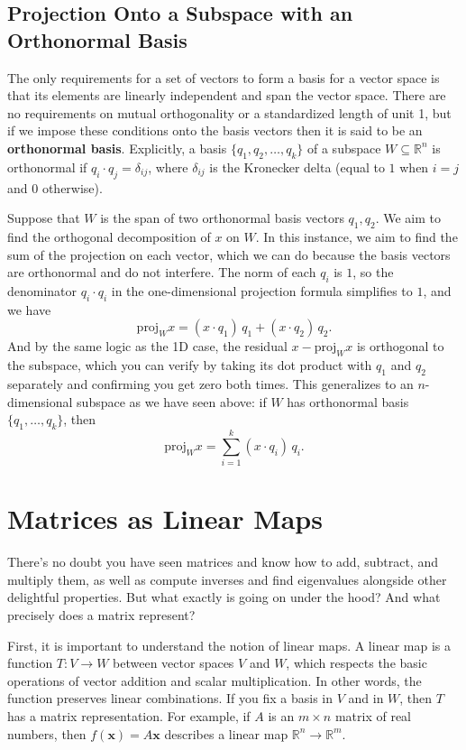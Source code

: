 \documentclass{article}
\begin{document}
\subsection{Projection Onto a Subspace with an Orthonormal Basis}

The only requirements for a set of vectors to form a basis for a vector space is that its elements
are linearly independent and span the vector space. There are no requirements on mutual orthogonality or a standardized length of unit 1, but if we impose these conditions onto the basis vectors then it is said to be an \textbf{orthonormal basis}. Explicitly, a basis $\{q_1, q_2, \dots, q_k\}$ of a subspace $W \subseteq \mathbb{R}^n$ is orthonormal if $q_i \cdot q_j = \delta_{ij}$, where $\delta_{ij}$ is the Kronecker delta (equal to $1$ when $i = j$ and $0$ otherwise).

Suppose that $W$ is the span of two orthonormal basis vectors $q_1, q_2$. We aim to find the orthogonal decomposition of $x$ on $W$. In this instance, we aim to find the sum of the projection on each vector, which we can do because the basis vectors are orthonormal and do not interfere. The norm of each $q_i$ is $1$, so the denominator $q_i \cdot q_i$ in the one-dimensional projection formula simplifies to $1$, and we have 
$$\text{proj}_W x = (x \cdot q_1)\, q_1 + (x \cdot q_2)\, q_2.$$
And by the same logic as the 1D case, the residual $x - \text{proj}_W x$ is orthogonal to the subspace, which you can verify by taking its dot product with $q_1$ and $q_2$ separately and confirming you get zero both times.
This generalizes to an $n$-dimensional subspace as we have seen above: if $W$ has orthonormal basis $\{q_1, \dots, q_k\}$, then
$$\text{proj}_W x = \sum_{i=1}^k (x \cdot q_i)\, q_i.$$

\section{Matrices as Linear Maps}

There's no doubt you have seen matrices and know how to add, subtract, and multiply them, as well as compute inverses and find eigenvalues alongside other delightful properties. But what exactly is going on under the hood? And what precisely does a matrix represent?
 
First, it is important to understand the notion of linear maps. A linear map is a function $T: V \rightarrow W$ between vector spaces $V$ and $W$, which respects the basic operations of vector addition and scalar multiplication. In other words, the function preserves linear combinations. If you fix a basis in $V$ and in $W$, then $T$ has a matrix representation. For example, if $A$ is an $m \times n$ matrix of real numbers, then $f(\textbf{x})=A\textbf{x}$ describes a linear map $\mathbb{R}^n \rightarrow \mathbb{R}^m$.
 
\end{document}

